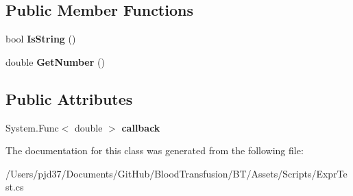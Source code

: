 \subsection*{Public Member Functions}
\begin{DoxyCompactItemize}
\item 
bool {\bfseries Is\+String} ()\hypertarget{class_b83_1_1_logic_expression_parser_1_1_delegate_number_aa4a76a979703bad92eb54923bd03ee94}{}\label{class_b83_1_1_logic_expression_parser_1_1_delegate_number_aa4a76a979703bad92eb54923bd03ee94}

\item 
double {\bfseries Get\+Number} ()\hypertarget{class_b83_1_1_logic_expression_parser_1_1_delegate_number_aef1f9121b9a10bc5815379d6fb86c825}{}\label{class_b83_1_1_logic_expression_parser_1_1_delegate_number_aef1f9121b9a10bc5815379d6fb86c825}

\end{DoxyCompactItemize}
\subsection*{Public Attributes}
\begin{DoxyCompactItemize}
\item 
System.\+Func$<$ double $>$ {\bfseries callback}\hypertarget{class_b83_1_1_logic_expression_parser_1_1_delegate_number_a9b536a4b068b2e215bb2269e2bc477a5}{}\label{class_b83_1_1_logic_expression_parser_1_1_delegate_number_a9b536a4b068b2e215bb2269e2bc477a5}

\end{DoxyCompactItemize}


The documentation for this class was generated from the following file\+:\begin{DoxyCompactItemize}
\item 
/\+Users/pjd37/\+Documents/\+Git\+Hub/\+Blood\+Transfusion/\+B\+T/\+Assets/\+Scripts/Expr\+Test.\+cs\end{DoxyCompactItemize}

